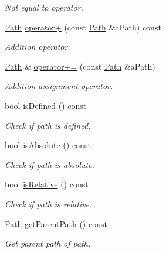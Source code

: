 \begin{DoxyCompactItemize}
\begin{DoxyCompactList}\small\item\em Not equal to operator. \end{DoxyCompactList}\item 
\hyperlink{classlibrary_1_1core_1_1fs_1_1_path}{Path} \hyperlink{classlibrary_1_1core_1_1fs_1_1_path_a3f86a7054939a51f44b2f5a796470071}{operator+} (const \hyperlink{classlibrary_1_1core_1_1fs_1_1_path}{Path} \&a\+Path) const
\begin{DoxyCompactList}\small\item\em Addition operator. \end{DoxyCompactList}\item 
\hyperlink{classlibrary_1_1core_1_1fs_1_1_path}{Path} \& \hyperlink{classlibrary_1_1core_1_1fs_1_1_path_a79ce7b2d9ac53e3bb22240f8cd5c883a}{operator+=} (const \hyperlink{classlibrary_1_1core_1_1fs_1_1_path}{Path} \&a\+Path)
\begin{DoxyCompactList}\small\item\em Addition assignment operator. \end{DoxyCompactList}\item 
bool \hyperlink{classlibrary_1_1core_1_1fs_1_1_path_a4315cfd12f61bf477e010f33122c3d0c}{is\+Defined} () const
\begin{DoxyCompactList}\small\item\em Check if path is defined. \end{DoxyCompactList}\item 
bool \hyperlink{classlibrary_1_1core_1_1fs_1_1_path_a9a5772dfc1273a74137ca301e9a84d61}{is\+Absolute} () const
\begin{DoxyCompactList}\small\item\em Check if path is absolute. \end{DoxyCompactList}\item 
bool \hyperlink{classlibrary_1_1core_1_1fs_1_1_path_a97cf61b699efe17e23ac3a91daf897e2}{is\+Relative} () const
\begin{DoxyCompactList}\small\item\em Check if path is relative. \end{DoxyCompactList}\item 
\hyperlink{classlibrary_1_1core_1_1fs_1_1_path}{Path} \hyperlink{classlibrary_1_1core_1_1fs_1_1_path_a0cdc72946505290b9fc2022618f118d9}{get\+Parent\+Path} () const
\begin{DoxyCompactList}\small\item\em Get parent path of path. \end{DoxyCompactList}\item 

\end{DoxyCompactItemize}

